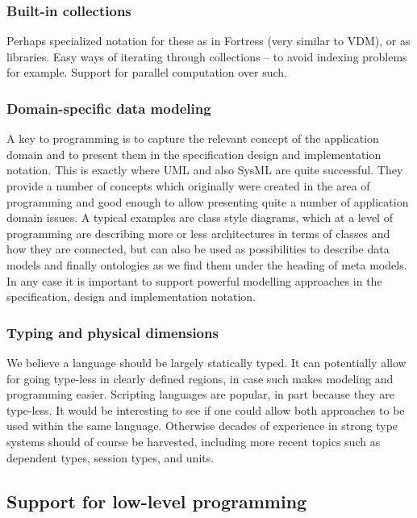 \subsubsection{Built-in collections}

Perhaps specialized notation for these as in Fortress (very similar 
to VDM), or as libraries. Easy ways of iterating through 
collections – to avoid indexing problems for example. Support for 
parallel computation over such.

\subsubsection{Domain-specific data modeling}

A key to programming is to capture the relevant concept of the 
application domain and to present them in the specification design 
and implementation notation. This is exactly where UML and also 
SysML are quite successful. They provide a number of concepts which 
originally were created in the area of programming and good enough 
to allow presenting quite a number of application domain issues. A 
typical examples are class style diagrams, which at a level of 
programming are describing more or less architectures in terms of 
classes and how they are connected, but can also be used as 
possibilities to describe data models and finally ontologies as we 
find them under the heading of meta models. In any case it is 
important to support powerful modelling approaches in the 
specification, design and implementation notation.

\subsubsection{Typing and physical dimensions}

We believe a language should be largely statically typed. It can 
potentially allow for going type-less in clearly defined regions, 
in case such makes modeling and programming easier. Scripting 
languages are popular, in part because they are type-less. It would 
be interesting to see if one could allow both approaches to be used 
within the same language. Otherwise decades of experience in strong 
type systems should of course be harvested, including more recent 
topics such as dependent types, session types, and units.

\subsection{Support for low-level programming}

